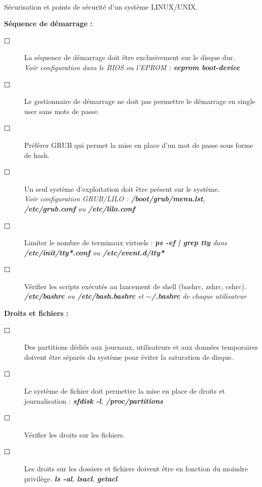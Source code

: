 \documentclass[a4paper,11pt]{article}				    %
\begin{document}
{
\\S\'ecurisation et points de s\'ecurit\'e d'un syst\`eme LINUX/UNIX.
}
{
\textbf{S\'equence de d\'emarrage :}
\begin{description}
    \item[$\Square$] La s\'equence de d\'emarrage doit \^etre exclusivement sur le disque dur.\\
	{\sl \color{blue} Voir configuration dans le BIOS ou l'EPROM : \textbf{eeprom boot-device}}

    \item[$\Square$] Le gestionnaire de d\'emarrage ne doit pas permettre le d\'emarrage en single user sans mots de passe.
    \item[$\Square$] Pr\'ef\'erer GRUB qui permet la mise en place d'un mot de passe sous forme de hash.
    \item[$\Square$] Un seul syst\`eme d'exploitation doit \^etre pr\'esent sur le syst\`eme.\\
	{\sl \color{blue} Voir configuration GRUB/LILO : \textbf{/boot/grub/menu.lst}, \textbf{/etc/grub.conf} ou \textbf{/etc/lilo.conf}}
    \item[$\Square$] Limiter le nombre de terminaux virtuels : 
	{\sl \color{blue}\textbf{ps -ef | grep tty} dans \textbf{/etc/init/tty*.conf} ou \textbf{/etc/event.d/tty*}}

    \item[$\Square$] V\'erifier les scripts ex\'ecut\'es au lancement de shell (bashrc, zshrc, cshrc).\\
	{\sl \color{blue}\textbf{/etc/bashrc} ou \textbf{/etc/bash.bashrc} et \textbf{$\sim$/.bashrc} de chaque utilisateur}
\end{description}
\vskip-0.1cm
\textbf{Droits et fichiers :}
\begin{description}
 	\item[$\Square$] Des partitions d\'edi\'es aux journaux, utilisateurs et aux donn\'ees temporaires doivent \^etre s\'epar\'es du syst\`eme pour \'eviter la saturation de disque.
 	\item[$\Square$] Le syst\`eme de fichier doit permettre la mise en place de droits et journalisation : 
{\sl \color{blue} \textbf{sfdisk -l}, \textbf{/proc/partitions}}
	\item[$\Square$] V\'erifier les droits sur les fichiers.
	\item[$\Square$] Les droits sur les dossiers et fichiers doivent \^etre en fonction du moindre privil\`ege. {\sl \color{blue} \textbf{ls -al}, \textbf{lsacl}, \textbf{getacl}}


\end{description}}
\end{document}
